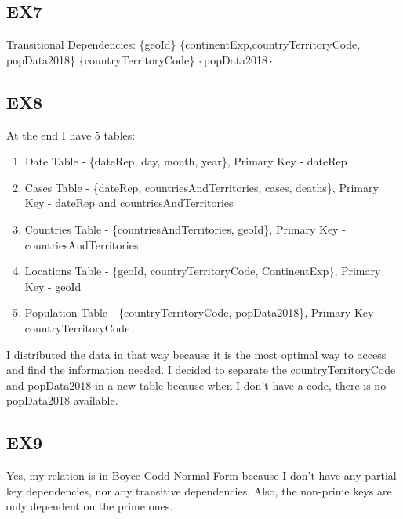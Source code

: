 \documentclass{article}
\begin{document}
\subsection{EX7}
Transitional Dependencies:
\newline
\newline
\{geoId\} \longrightarrow \{continentExp,countryTerritoryCode, popData2018\}
\newline
\newline
\{countryTerritoryCode\} \longrightarrow \{popData2018\}
\newline
\newline
\subsection{EX8}

At the end I have 5 tables: 
\newline
\begin{enumerate}
    \item Date Table - \{dateRep, day, month, year\}, Primary Key - dateRep
    \item Cases Table - \{dateRep, countriesAndTerritories, cases, deaths\}, Primary Key - dateRep and countriesAndTerritories
    \item Countries Table - \{countriesAndTerritories, geoId\}, Primary Key - countriesAndTerritories
    \item Locations Table - \{geoId, countryTerritoryCode, ContinentExp\}, Primary Key - geoId
    \item Population Table - \{countryTerritoryCode, popData2018\}, Primary Key - countryTerritoryCode
\end{enumerate}

    I distributed the data in that way because it is the most optimal way to access and find the information needed. I decided to separate the countryTerritoryCode and popData2018 in a new table because when I don't have a code, there is no popData2018 available.
    \newline
    \newline
\subsection{EX9}
Yes, my relation is in Boyce-Codd Normal Form because I don't have any partial key dependencies, nor any transitive dependencies. Also, the non-prime keys are only dependent on the prime ones.
\newline
\newline
\end{document}

